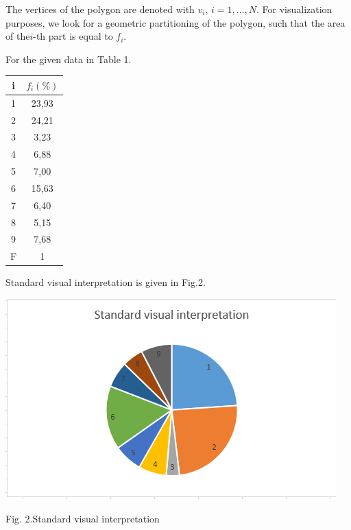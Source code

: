 \documentclass[11pt,leqno]{book}
\begin{document}
The vertices of the polygon are denoted with $v_i$, $ i = 1, \ldots, N$.
For visualization purposes, we look for a geometric partitioning of the polygon, such that the area of the$i$-th part is equal to $f_i$.

For the given  data  in Table 1.

\begin{table}[h!]
\begin{center} \scriptsize{
\begin{tabular}{|c|c|}
\hline
 i & $f_i(\%)$ \\
\hline
 1 & 23,93 \\
\hline
 2 & 24,21 \\
\hline
 3 & 3,23  \\
\hline
 4 & 6,88 \\
\hline
 5 & 7,00 \\
\hline
 6 & 15,63  \\
\hline
 7 & 6,40 \\
\hline
 8 & 5,15 \\
\hline
 9 & 7,68  \\
\hline
 F & 1 \\
  \hline
\end{tabular}
}
\end{center}
\end{table}

Standard visual interpretation is given in Fig.2.

\begin{center}
\includegraphics  [scale=0.58] {pic02.png}

Fig. 2.{Standard visual interpretation}
\label{fig2}
\end{center}
\end{document}
